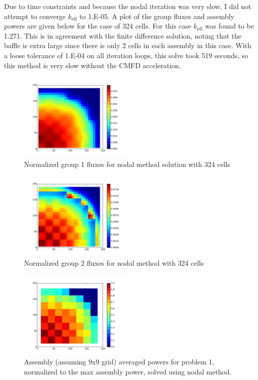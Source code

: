 \documentclass[12pt]{article}
\newcommand{\keff}{\ensuremath{k_{\mathrm{eff}}}}
\newenvironment{solnum}[2][Solution]{\begin{trivlist}
\item[\hskip \labelsep {\bfseries #1}\hskip \labelsep {\bfseries #2:}]\hspace{0.3in}\newline\newline}{\end{trivlist}}
\begin{document}
\begin{solnum}{1-2}
Due to time constraints and because the nodal iteration was very slow, I did not
attempt to converge $\keff$ to 1.E-05.  A plot of the group fluxes and assembly powers are
given below for the case of 324 cells.  For this case $\keff$ was found to be
1.271.  This is in agreement with the finite difference solution, noting that the baffle is extra
large since there is only 2 cells in each assembly in this case.  With a loose tolerance of 1.E-04 on all iteration loops, this solve took
519 seconds, so this method is very slow without the CMFD acceleration.
\begin{figure}
    \centering
    \caption{Normalized group 1 fluxes for nodal method solution with 324 cells}
    \includegraphics[width=0.5\textwidth]{prob1_g1_nodal.pdf}
\end{figure}

\begin{figure}
    \centering
    \caption{Normalized group 2 fluxes for nodal method with 324 cells}
    \includegraphics[width=0.5\textwidth]{prob1_g2_nodal.pdf}
\end{figure}

\begin{figure}
    \centering
    \caption{Assembly (assuming 9x9 grid) averaged powers for problem 1, normalized
    to the max assembly power, solved using nodal method.}
    \includegraphics[width=0.5\textwidth]{powers_nodal.pdf}
\end{figure}



\end{solnum}
\end{document}

